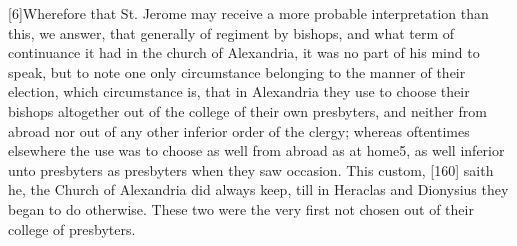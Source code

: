 [6]Wherefore that St. Jerome may receive a more probable interpretation than this, we answer, that generally of regiment by bishops, and what term of continuance it had in the church of Alexandria, it was no part of his mind to speak, but to note one only circumstance belonging to the manner of their election, which circumstance is, that in Alexandria they use to choose their bishops altogether out of the college of their own presbyters, and neither from abroad nor out of any other inferior order of the clergy; whereas oftentimes elsewhere the use was to choose as well from abroad as at home5, as well inferior unto presbyters as presbyters when they saw occasion. This custom, [160] saith he, the Church of Alexandria did always keep, till in Heraclas and Dionysius they began to do otherwise. These two were the very first not chosen out of their college of presbyters.

